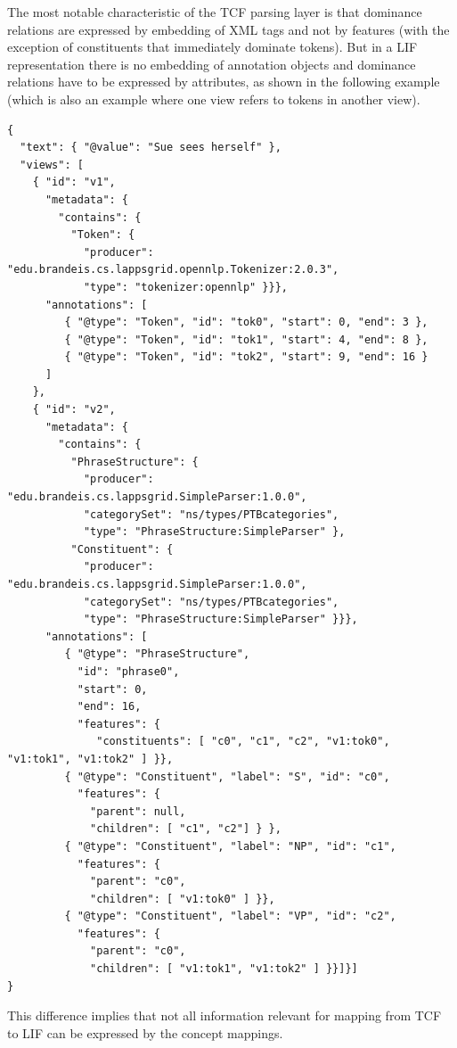 \documentclass[11pt]{article}
\newenvironment{example}
    {\begin{tcolorbox}\small}
    {\end{tcolorbox}}
\begin{document}
The most notable characteristic of the TCF parsing layer is that dominance relations are expressed by embedding of XML tags and not by features (with the exception of constituents that immediately dominate tokens). But in a LIF representation there is no embedding of annotation objects and dominance relations have to be expressed by attributes, as shown in the following example (which is also an example where one view refers to tokens in another view).

\begin{example}
\begin{verbatim}
{
  "text": { "@value": "Sue sees herself" },
  "views": [
    { "id": "v1",
      "metadata": {
        "contains": {
          "Token": {
            "producer": "edu.brandeis.cs.lappsgrid.opennlp.Tokenizer:2.0.3",
            "type": "tokenizer:opennlp" }}},
      "annotations": [
         { "@type": "Token", "id": "tok0", "start": 0, "end": 3 },
         { "@type": "Token", "id": "tok1", "start": 4, "end": 8 },
         { "@type": "Token", "id": "tok2", "start": 9, "end": 16 }
      ]
    },
    { "id": "v2",
      "metadata": {
        "contains": {
          "PhraseStructure": {
            "producer": "edu.brandeis.cs.lappsgrid.SimpleParser:1.0.0",
            "categorySet": "ns/types/PTBcategories",
            "type": "PhraseStructure:SimpleParser" },
          "Constituent": {
            "producer": "edu.brandeis.cs.lappsgrid.SimpleParser:1.0.0",
            "categorySet": "ns/types/PTBcategories",
            "type": "PhraseStructure:SimpleParser" }}},
      "annotations": [
         { "@type": "PhraseStructure",
           "id": "phrase0",
           "start": 0,
           "end": 16,
           "features": {
              "constituents": [ "c0", "c1", "c2", "v1:tok0", "v1:tok1", "v1:tok2" ] }},
         { "@type": "Constituent", "label": "S", "id": "c0",
           "features": {
             "parent": null,
             "children": [ "c1", "c2"] } },
         { "@type": "Constituent", "label": "NP", "id": "c1",
           "features": {
             "parent": "c0",
             "children": [ "v1:tok0" ] }},
         { "@type": "Constituent", "label": "VP", "id": "c2",
           "features": {
             "parent": "c0",
             "children": [ "v1:tok1", "v1:tok2" ] }}]}]
}
\end{verbatim}
\end{example}

This difference implies that not all information relevant for mapping  from TCF to LIF can be expressed by the concept mappings.
\end{document}
